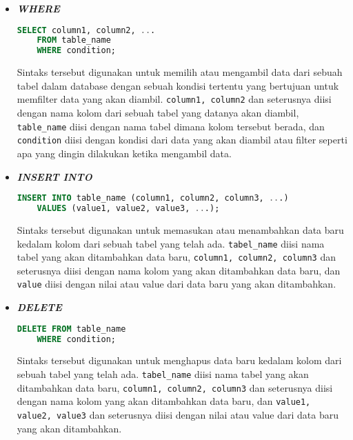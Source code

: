 \begin{itemize}
    \item \textbf{\textit{WHERE}}
    \begin{lstlisting}[language=SQL]
    SELECT column1, column2, ...
    FROM table_name
    WHERE condition;
    \end{lstlisting}
    Sintaks tersebut digunakan untuk memilih atau mengambil data dari sebuah tabel dalam database dengan sebuah kondisi tertentu yang bertujuan untuk memfilter data yang akan diambil. \texttt{column1, column2} dan seterusnya diisi dengan nama kolom dari sebuah tabel yang datanya akan diambil, \texttt{table\_name} diisi dengan nama tabel dimana kolom tersebut berada, dan \texttt{condition} diisi dengan kondisi dari data yang akan diambil atau filter seperti apa yang dingin dilakukan ketika mengambil data.

    \item \textbf{\textit{INSERT INTO}}
    \begin{lstlisting}[language=SQL]
    INSERT INTO table_name (column1, column2, column3, ...)
    VALUES (value1, value2, value3, ...);
    \end{lstlisting}
    Sintaks tersebut digunakan untuk memasukan atau menambahkan data baru kedalam kolom dari sebuah tabel yang telah ada. \texttt{tabel\_name} diisi nama tabel yang akan ditambahkan data baru, \texttt{column1, column2, column3} dan seterusnya diisi dengan nama kolom yang akan ditambahkan data baru, dan \texttt{value} diisi dengan nilai atau value dari data baru yang akan ditambahkan.

    \item \textbf{\textit{DELETE}}
    \begin{lstlisting}[language=SQL]
    DELETE FROM table_name
    WHERE condition;
    \end{lstlisting}
     Sintaks tersebut digunakan untuk menghapus data baru kedalam kolom dari sebuah tabel yang telah ada. \texttt{tabel\_name} diisi nama tabel yang akan ditambahkan data baru, \texttt{column1, column2, column3} dan seterusnya diisi dengan nama kolom yang akan ditambahkan data baru, dan \texttt{value1, value2, value3} dan seterusnya diisi dengan nilai atau value dari data baru yang akan ditambahkan.
\end{itemize}

